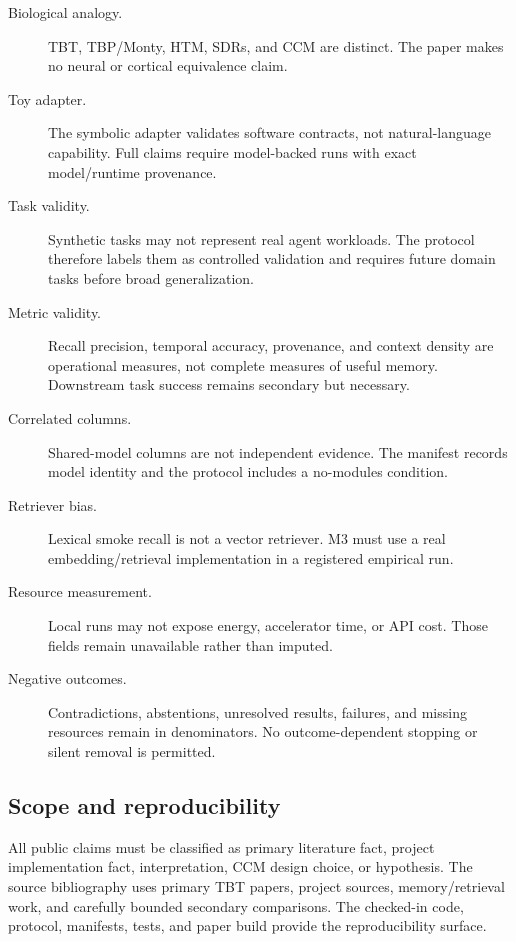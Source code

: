\begin{description}
  \item[Biological analogy.] TBT, TBP/Monty, HTM, SDRs, and CCM are distinct. The paper makes no neural or cortical equivalence claim.
  \item[Toy adapter.] The symbolic adapter validates software contracts, not natural-language capability. Full claims require model-backed runs with exact model/runtime provenance.
  \item[Task validity.] Synthetic tasks may not represent real agent workloads. The protocol therefore labels them as controlled validation and requires future domain tasks before broad generalization.
  \item[Metric validity.] Recall precision, temporal accuracy, provenance, and context density are operational measures, not complete measures of useful memory. Downstream task success remains secondary but necessary.
  \item[Correlated columns.] Shared-model columns are not independent evidence. The manifest records model identity and the protocol includes a no-modules condition.
  \item[Retriever bias.] Lexical smoke recall is not a vector retriever. M3 must use a real embedding/retrieval implementation in a registered empirical run.
  \item[Resource measurement.] Local runs may not expose energy, accelerator time, or API cost. Those fields remain unavailable rather than imputed.
  \item[Negative outcomes.] Contradictions, abstentions, unresolved results, failures, and missing resources remain in denominators. No outcome-dependent stopping or silent removal is permitted.
\end{description}

\subsection{Scope and reproducibility}

All public claims must be classified as primary literature fact, project implementation fact, interpretation, CCM design choice, or hypothesis. The source bibliography uses primary TBT papers, project sources, memory/retrieval work, and carefully bounded secondary comparisons. The checked-in code, protocol, manifests, tests, and paper build provide the reproducibility surface.
